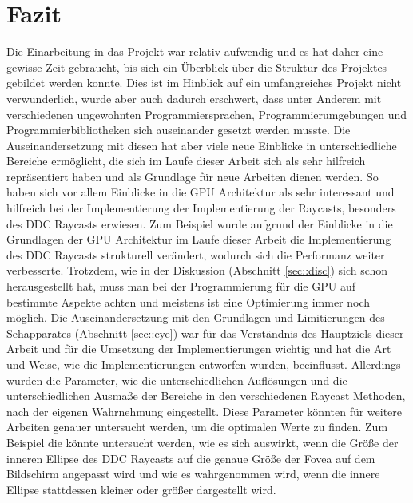 \chapter{Fazit}\label{chap:zusfas}
Die Einarbeitung in das Projekt war relativ aufwendig und es hat daher eine gewisse Zeit gebraucht, bis sich ein Überblick über die Struktur des Projektes gebildet werden konnte.
Dies ist im Hinblick auf ein umfangreiches Projekt nicht verwunderlich, wurde aber auch dadurch erschwert, dass unter Anderem mit verschiedenen ungewohnten Programmiersprachen, Programmierumgebungen und Programmierbibliotheken sich auseinander gesetzt werden musste.
Die Auseinandersetzung mit diesen hat aber viele neue Einblicke in unterschiedliche Bereiche ermöglicht, die sich im Laufe dieser Arbeit sich als sehr hilfreich repräsentiert haben und als Grundlage für neue Arbeiten dienen werden.
So haben sich vor allem Einblicke in die GPU Architektur als sehr interessant und hilfreich bei der Implementierung der Implementierung der Raycasts, besonders des DDC Raycasts erwiesen.
Zum Beispiel wurde aufgrund der Einblicke in die Grundlagen der GPU Architektur im Laufe dieser Arbeit die Implementierung des DDC Raycasts strukturell verändert, wodurch sich die Performanz weiter verbesserte.
Trotzdem, wie in der Diskussion (Abschnitt \ref{sec::disc}) sich schon herausgestellt hat, muss man bei der Programmierung für die GPU auf bestimmte Aspekte achten und meistens ist eine Optimierung immer noch möglich.
Die Auseinandersetzung mit den Grundlagen und Limitierungen des Sehapparates (Abschnitt \ref{sec::eye}) war für das Verständnis des Hauptziels dieser Arbeit und für die Umsetzung der Implementierungen wichtig und hat die Art und Weise, wie die Implementierungen entworfen wurden, beeinflusst.
Allerdings wurden die Parameter, wie die unterschiedlichen Auflösungen und die unterschiedlichen Ausmaße der Bereiche in den verschiedenen Raycast Methoden, nach der eigenen Wahrnehmung eingestellt.
Diese Parameter könnten für weitere Arbeiten genauer untersucht werden, um die optimalen Werte zu finden.
Zum Beispiel die könnte untersucht werden, wie es sich auswirkt, wenn die Größe der inneren Ellipse des DDC Raycasts auf die genaue Größe der Fovea auf dem Bildschirm angepasst wird und wie es wahrgenommen wird, wenn die innere Ellipse stattdessen kleiner oder größer dargestellt wird.

